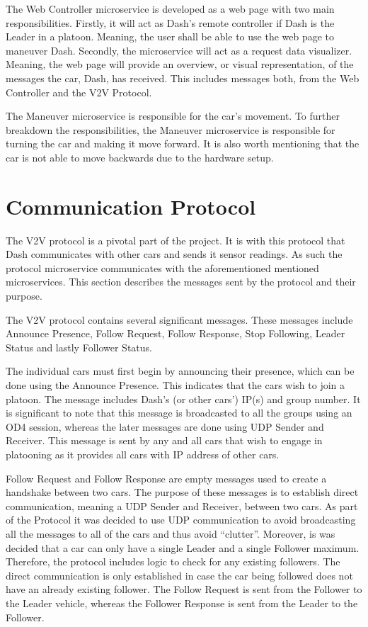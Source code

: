 \documentclass[12pt]{article}
\begin{document}
The Web Controller microservice is developed as a web page with two main responsibilities. Firstly, it will act as Dash’s remote controller if Dash is the Leader in a platoon. Meaning, the user shall be able to use the web page to maneuver Dash. Secondly, the microservice will act as a request data visualizer. Meaning, the web page will provide an overview, or visual representation, of the messages the car, Dash, has received. This includes messages both, from the Web Controller and the V2V Protocol. \par  

The Maneuver microservice is responsible for the car’s movement. To further breakdown the responsibilities, the Maneuver microservice is responsible for turning the car and making it move forward. It is also worth mentioning that the car is not able to move backwards due to the hardware setup.\par

\section{Communication Protocol}
The V2V protocol is a pivotal part of the project. It is with this protocol that Dash communicates with other cars and sends it sensor readings. As such the protocol microservice communicates with the aforementioned mentioned microservices. This section describes the messages sent by the protocol and their purpose. \par

The V2V protocol contains several significant messages. These messages include Announce Presence, Follow Request, Follow Response, Stop Following, Leader Status and lastly Follower Status. \par

The individual cars must first begin by announcing their presence, which can be done using the Announce Presence. This indicates that the cars wish to join a platoon. The message includes Dash’s (or other cars’) IP(s) and group number. It is significant to note that this message is broadcasted to all the groups using an OD4 session, whereas the later messages are done using UDP Sender and Receiver. This message is sent by any and all cars that wish to engage in platooning as it provides all cars with IP address of other cars. \par

Follow Request and Follow Response are empty messages used to create a handshake between two cars. The purpose of these messages is to establish direct communication, meaning a UDP Sender and Receiver, between two cars. As part of the Protocol it was decided to use UDP communication to avoid broadcasting all the messages to all of the cars and thus avoid “clutter”. Moreover, is was decided that a car can only have a single Leader and a single Follower maximum. Therefore, the protocol includes logic to check for any existing followers. The direct communication is only established in case the car being followed does not have an already existing follower. The Follow Request is sent from the Follower to the Leader vehicle, whereas the Follower Response is sent from the Leader to the Follower. \par
\end{document}
